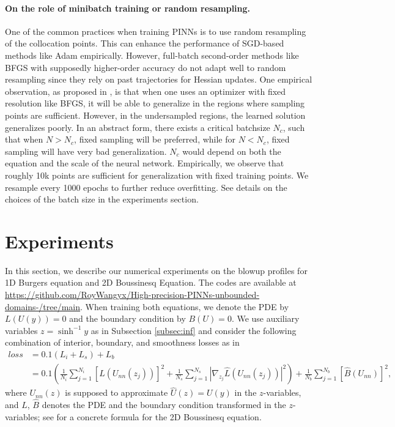 \documentclass[12pt]{caltech_thesis}
\numberwithin{equation}{section}
\begin{document}
\paragraph{On the role of minibatch training or random resampling.}
    One of the common practices when training PINNs is to use random resampling of the collocation points. This can enhance the performance of SGD-based methods like Adam empirically. However, full-batch second-order methods like BFGS with supposedly higher-order accuracy do not adapt well to random resampling since they rely on past trajectories for Hessian updates. 
 One empirical observation, as proposed in \cite{wang2024multi}, is that when one uses an optimizer with fixed resolution like BFGS, it will be able to generalize in the regions where sampling points are sufficient.
 However, in the undersampled regions, the learned solution generalizes poorly. In an abstract form, there exists a critical batchsize $N_c$, such that when $N>N_c$, fixed sampling will be preferred, while for  $N<N_c$, fixed sampling will have very bad generalization. %
 $N_c$ would depend on both the equation and the scale of the neural network.
     Empirically, we observe that roughly 10k points are sufficient for generalization with fixed training points. We resample every 1000 epochs to further reduce overfitting. See details on the choices of the batch size in the experiments section.
    \section{Experiments}
    In this section, we describe our numerical experiments on the blowup profiles for 1D Burgers equation and 2D Boussinesq Equation. The codes are available at \url{https://github.com/RoyWangyx/High-precision-PINNs-unbounded-domains-/tree/main}. When training both equations, we denote the PDE by $L(U(y))=0$ and the boundary condition by $B(U)=0$. We use auxiliary variables $z=\sinh^{-1}y$ as in Subsection \ref{subsec:inf} and consider the following combination of interior, boundary, and smoothness losses as in \cite{wang2023asymptotic}
    \begin{equation}\label{eqn_loss}
 \begin{aligned}loss&=
        0.1(L_i+L_s)+L_b\\&= 0.1(\frac{1}{N_i}\sum_{j=1}^{N_i} [\hat{L}(U_{nn}(z_j))]^2+\frac{1}{N_s}\sum_{j=1}^{N_s} |\nabla_{z_j} \hat{L}(U_{nn}(z_j))|^2)+\frac{1}{N_b}\sum_{j=1}^{N_b} [\hat{B}(U_{nn})]^2,
    \end{aligned}       
    \end{equation}
    where $U_{nn}(z)$ is supposed to approximate $\hat{U}(z)=U(y)$ in the $z$-variables, and $\hat{L}$, $\hat{B}$ denotes the PDE and the boundary condition transformed in the $z$-variables; see \cite{wang2023asymptotic} for a concrete formula for the 2D Boussinesq equation.
\end{document}
